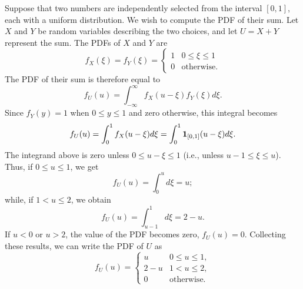 \begin{example}
Suppose that two numbers are independently selected from the interval $[0,1]$, each with a uniform distribution.
We wish to compute the PDF of their sum.
Let $X$ and $Y$ be random variables describing the two choices, and let $U = X + Y$ represent the sum.
The PDFs of $X$ and $Y$ are
\begin{equation*}
f_X(\xi) = f_Y(\xi)
= \begin{cases} 1 & 0 \leq \xi \leq 1 \\
0 & \text{otherwise} . \end{cases}
\end{equation*}
The PDF of their sum is therefore equal to
\begin{equation*}
f_U(u) = \int_{-\infty}^{\infty} f_X(u - \xi) f_Y(\xi) d\xi .
\end{equation*}
Since $f_Y(y) = 1$ when $0 \leq y \leq 1$ and zero otherwise, this integral becomes
\begin{equation*}
f_U (u) = \int_0^1 f_X(u - \xi) d\xi
= \int_0^1 \mathbf{1}_{[0,1]}(u - \xi) d\xi .
\end{equation*}
The integrand above is zero unless $0 \leq u - \xi \leq 1$ (i.e., unless $u - 1 \leq \xi \leq u$).
Thus, if $0 \leq u \leq 1$, we get
\begin{equation*}
f_U(u) = \int_0^u d\xi = u ;
\end{equation*}
while, if $1 < u \leq 2$, we obtain
\begin{equation*}
f_U(u) = \int_{u - 1}^1 d\xi = 2 - u .
\end{equation*}
If $u < 0$ or $u > 2$, the value of the PDF becomes zero, $f_U(u) = 0$.
Collecting these results, we can write the PDF of $U$ as
\begin{equation*}
f_U(u) = \begin{cases} u & 0 \leq u \leq 1, \\
2-u & 1 < u \leq 2, \\
0 & \text{otherwise} . \end{cases}
\end{equation*}
\end{example}

